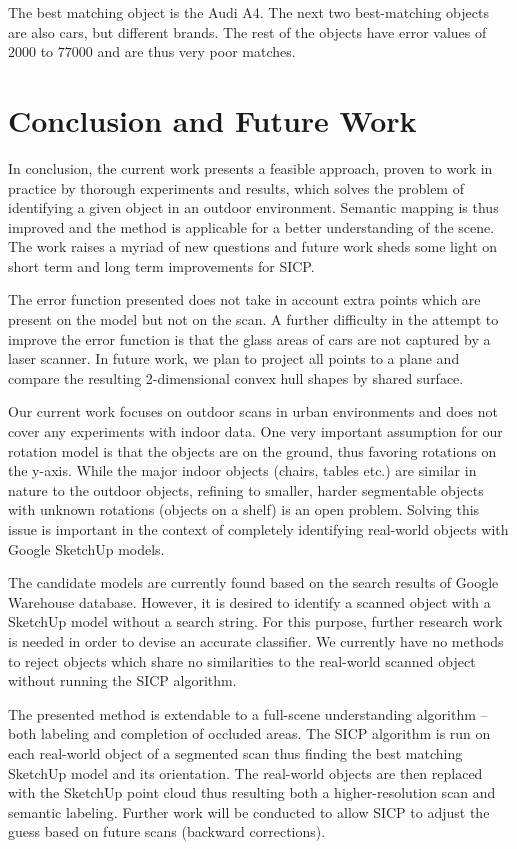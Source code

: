 \documentclass{llncs}
\begin{document}
The best matching object is the Audi A4. The next two best-matching
objects are also cars, but different brands. The rest of the objects
have error values of $2000$ to $77000$ and are thus very poor matches.

\section{Conclusion and Future Work}

In conclusion, the current work presents a feasible approach, proven
to work in practice by thorough experiments and results, which solves
the problem of identifying a given object in an outdoor
environment. Semantic mapping is thus improved and the method is
applicable for a better understanding of the scene. The work raises a
myriad of new questions and future work sheds some light on short term
and long term improvements for SICP.

The error function presented does not take in account extra points
which are present on the model but not on the scan. A further
difficulty in the attempt to improve the error function is that the
glass areas of cars are not captured by a laser scanner. In future
work, we plan to project all points to a plane and compare the
resulting 2-dimensional convex hull shapes by shared surface.

Our current work focuses on outdoor scans in urban environments and
does not cover any experiments with indoor data. One very important
assumption for our rotation model is that the objects are on the
ground, thus favoring rotations on the y-axis. While the major indoor
objects (chairs, tables etc.) are similar in nature to the outdoor
objects, refining to smaller, harder segmentable objects with unknown
rotations (objects on a shelf) is an open problem. Solving this issue
is important in the context of completely identifying real-world
objects with Google SketchUp models.

The candidate models are currently found based on the search results
of Google Warehouse database. However, it is desired to identify a
scanned object with a SketchUp model without a search string. For this
purpose, further research work is needed in order to devise an
accurate classifier. We currently have no methods to reject objects
which share no similarities to the real-world scanned object without
running the SICP algorithm.

The presented method is extendable to a full-scene understanding
algorithm -- both labeling and completion of occluded areas. The SICP
algorithm is run on each real-world object of a segmented scan thus
finding the best matching SketchUp model and its orientation. The
real-world objects are then replaced with the SketchUp point cloud
thus resulting both a higher-resolution scan and semantic
labeling. Further work will be conducted to allow SICP to adjust
the guess based on future scans (backward corrections).




\end{document}
